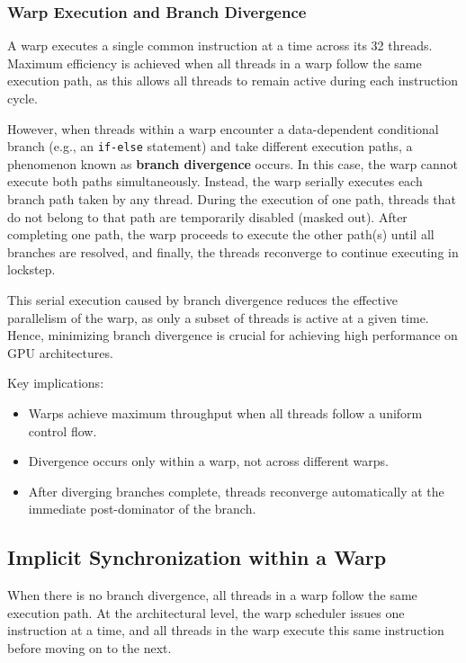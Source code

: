 \documentclass[12pt]{book}
\begin{document}
\subsubsection*{Warp Execution and Branch Divergence}

A warp executes a single common instruction at a time across its 32 threads. Maximum efficiency is achieved when all threads in a warp follow the same execution path, as this allows all threads to remain active during each instruction cycle.

However, when threads within a warp encounter a data-dependent conditional branch (e.g., an \texttt{if-else} statement) and take different execution paths, a phenomenon known as \textbf{branch divergence} occurs. In this case, the warp cannot execute both paths simultaneously. Instead, the warp serially executes each branch path taken by any thread. During the execution of one path, threads that do not belong to that path are temporarily disabled (masked out). After completing one path, the warp proceeds to execute the other path(s) until all branches are resolved, and finally, the threads reconverge to continue executing in lockstep.

This serial execution caused by branch divergence reduces the effective parallelism of the warp, as only a subset of threads is active at a given time. Hence, minimizing branch divergence is crucial for achieving high performance on GPU architectures.

Key implications:
\begin{itemize}
    \item Warps achieve maximum throughput when all threads follow a uniform control flow.
    \item Divergence occurs only within a warp, not across different warps.
    \item After diverging branches complete, threads reconverge automatically at the immediate post-dominator of the branch.
\end{itemize}

\subsection*{Implicit Synchronization within a Warp}

When there is no branch divergence, all threads in a warp follow the same execution path. At the architectural level, the warp scheduler issues one instruction at a time, and all threads in the warp execute this same instruction before moving on to the next. 
\end{document}
